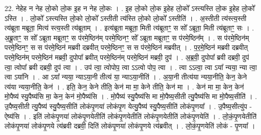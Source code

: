 \documentclass[17pt]{extarticle}
\begin{document}
22. नेहेह न नेह लो॒को लो॒क इ॒ह न नेह लो॒कः । . इ॒ह लो॒को लो॒क इ॒हेह लो॒को᳚ ऽस्त्यस्ति लो॒क इ॒हेह लो॒को᳚ ऽस्ति । . लो॒को᳚ ऽस्त्यस्ति लो॒को लो॒को᳚ ऽस्तीती त्य॑स्ति लो॒को लो॒को᳚ ऽस्तीति॑ । . अ॒स्तीती त्य॑स्त्य॒स्ती त्य॑ब्रूता मब्रूता॒ मित्य॑ स्त्य॒स्ती त्य॑ब्रूताम् । . इत्य॑ब्रूता मब्रूता॒ मिती त्य॑ब्रूताꣳ॒॒ स सो᳚ ऽब्रूता॒ मिती त्य॑ब्रूताꣳ॒॒ सः । . अ॒ब्रू॒ताꣳ॒॒ स सो᳚ ऽब्रूता मब्रूताꣳ॒॒ स प॑रमे॒ष्ठिन॑म् परमे॒ष्ठिनꣳ॒॒ सो᳚ ऽब्रूता मब्रूताꣳ॒॒ स प॑रमे॒ष्ठिन᳚म् । . स प॑रमे॒ष्ठिन॑म् परमे॒ष्ठिनꣳ॒॒ स स प॑रमे॒ष्ठिन॑ मब्रवी दब्रवीत् परमे॒ष्ठिनꣳ॒॒ स स प॑रमे॒ष्ठिन॑ मब्रवीत् । . प॒र॒मे॒ष्ठिन॑ मब्रवी दब्रवीत् परमे॒ष्ठिन॑म् परमे॒ष्ठिन॑ मब्रवी॒ दुपोपा᳚ ब्रवीत् परमे॒ष्ठिन॑म् परमे॒ष्ठिन॑ मब्रवी॒ दुप॑ । . अ॒ब्र॒वी॒ दुपोपा᳚ ब्रवी दब्रवी॒ दुप॑ त्वा॒ त्वोपा᳚ ब्रवी दब्रवी॒ दुप॑ त्वा । . उप॑ त्वा॒ त्वोपोप॒ त्वा ऽऽत्वो पोप॒ त्वा । . त्वा ऽऽत्वा॒ त्वा ऽया᳚ न्यया॒ न्या त्वा॒ त्वा ऽया॑नि । . आ ऽया᳚ न्यया॒ न्याऽया॒नी तीत्य॑ या॒ न्याऽया॒नीति॑ । . अ॒या॒नी तीत्य॑या न्यया॒नीति॒ केन॒ केने त्य॑या न्यया॒नीति॒ केन॑ । . इति॒ केन॒ केने तीति॒ केन॑ मा मा॒ केने तीति॒ केन॑ मा । . केन॑ मा मा॒ केन॒ केन॑ मो॒पैष्य॑ स्यु॒पैष्य॑सि मा॒ केन॒ केन॑ मो॒पैष्य॑सि । . मो॒पैष्य॑ स्यु॒पैष्य॑सि मा मो॒पैष्य॒सीती त्यु॒पैष्य॑सि मा मो॒पैष्य॒सीति॑ । . उ॒पैष्य॒सीती त्यु॒पैष्य॑ स्यु॒पैष्य॒सीति॑ लोकंपृ॒णया॑ लोकंपृ॒ण येत्यु॒पैष्य॑ स्यु॒पैष्य॒सीति॑ लोकंपृ॒णया᳚ । . उ॒पैष्य॒सीत्यु॑प - ऐष्य॑सि । . इति॑ लोकंपृ॒णया॑ लोकंपृ॒णयेतीति॑ लोकंपृ॒णयेतीति॑ लोकंपृ॒णयेतीति॑ लोकंपृ॒णयेति॑ । . लो॒कं॒पृ॒णयेतीति॑ लोकंपृ॒णया॑ लोकंपृ॒णये त्य॑ब्रवी दब्रवी॒ दिति॑ लोकंपृ॒णया॑ लोकंपृ॒णये त्य॑ब्रवीत् । . लो॒कं॒पृ॒णयेति॑ लोकं - पृ॒णया᳚ । \newline
\end{document}
